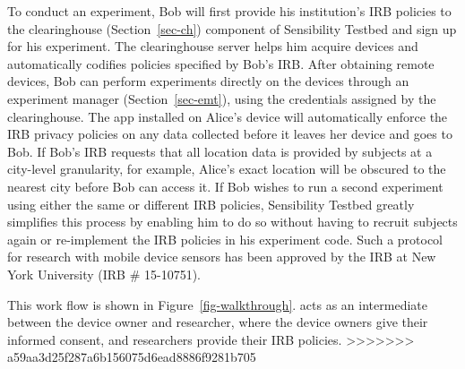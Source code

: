 To conduct an experiment, Bob will first provide his institution's 
IRB policies to the clearinghouse (Section~\ref{sec-ch}) component of Sensibility Testbed 
and sign up for his experiment. 
The clearinghouse server helps him acquire devices and automatically codifies 
policies specified by Bob's IRB. After obtaining remote devices, 
Bob can perform experiments directly on the devices through 
an experiment manager (Section~\ref{sec-emt}), using the 
credentials assigned by the clearinghouse. The app installed on Alice's device will 
automatically enforce the IRB privacy policies on any data collected before it leaves her device and 
goes to Bob. If Bob's IRB requests that all location data is provided by subjects at 
a city-level granularity, for example, Alice's exact location will be obscured 
to the nearest city before Bob can access it. 
If Bob wishes to run a
second experiment using either the same or different IRB policies, Sensibility Testbed 
greatly simplifies this process by enabling 
him to do so without having to recruit subjects again or re-implement the 
IRB policies in his experiment code.
Such a 
protocol for research with mobile device sensors has been approved by
the IRB at New York University (IRB \# 15-10751). 

This work flow is shown in Figure~\ref{fig-walkthrough}. \sysname
acts as an intermediate between the device owner and researcher, 
where the device owners give their informed consent, and researchers
provide their IRB policies. 
>>>>>>> a59aa3d25f287a6b156075d6ead8886f9281b705



